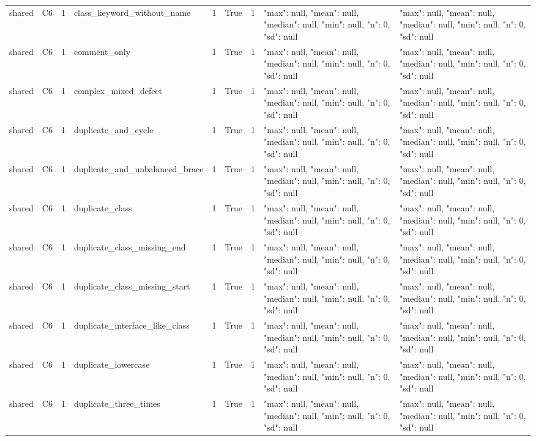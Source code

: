 \begin{tabular}{lllllllll}
shared & C6 & 1 & class\_keyword\_without\_name & 1 & True & 1 & {"max": null, "mean": null, "median": null, "min": null, "n": 0, "sd": null} & {"max": null, "mean": null, "median": null, "min": null, "n": 0, "sd": null} \\
shared & C6 & 1 & comment\_only & 1 & True & 1 & {"max": null, "mean": null, "median": null, "min": null, "n": 0, "sd": null} & {"max": null, "mean": null, "median": null, "min": null, "n": 0, "sd": null} \\
shared & C6 & 1 & complex\_mixed\_defect & 1 & True & 1 & {"max": null, "mean": null, "median": null, "min": null, "n": 0, "sd": null} & {"max": null, "mean": null, "median": null, "min": null, "n": 0, "sd": null} \\
shared & C6 & 1 & duplicate\_and\_cycle & 1 & True & 1 & {"max": null, "mean": null, "median": null, "min": null, "n": 0, "sd": null} & {"max": null, "mean": null, "median": null, "min": null, "n": 0, "sd": null} \\
shared & C6 & 1 & duplicate\_and\_unbalanced\_brace & 1 & True & 1 & {"max": null, "mean": null, "median": null, "min": null, "n": 0, "sd": null} & {"max": null, "mean": null, "median": null, "min": null, "n": 0, "sd": null} \\
shared & C6 & 1 & duplicate\_class & 1 & True & 1 & {"max": null, "mean": null, "median": null, "min": null, "n": 0, "sd": null} & {"max": null, "mean": null, "median": null, "min": null, "n": 0, "sd": null} \\
shared & C6 & 1 & duplicate\_class\_missing\_end & 1 & True & 1 & {"max": null, "mean": null, "median": null, "min": null, "n": 0, "sd": null} & {"max": null, "mean": null, "median": null, "min": null, "n": 0, "sd": null} \\
shared & C6 & 1 & duplicate\_class\_missing\_start & 1 & True & 1 & {"max": null, "mean": null, "median": null, "min": null, "n": 0, "sd": null} & {"max": null, "mean": null, "median": null, "min": null, "n": 0, "sd": null} \\
shared & C6 & 1 & duplicate\_interface\_like\_class & 1 & True & 1 & {"max": null, "mean": null, "median": null, "min": null, "n": 0, "sd": null} & {"max": null, "mean": null, "median": null, "min": null, "n": 0, "sd": null} \\
shared & C6 & 1 & duplicate\_lowercase & 1 & True & 1 & {"max": null, "mean": null, "median": null, "min": null, "n": 0, "sd": null} & {"max": null, "mean": null, "median": null, "min": null, "n": 0, "sd": null} \\
shared & C6 & 1 & duplicate\_three\_times & 1 & True & 1 & {"max": null, "mean": null, "median": null, "min": null, "n": 0, "sd": null} & {"max": null, "mean": null, "median": null, "min": null, "n": 0, "sd": null} \\

\end{tabular}
